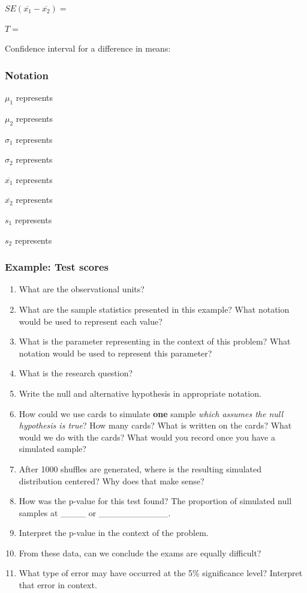 \documentclass[
]{report}
\newcommand{\rgs}{\vspace{12pt}} %
\begin{document}
\(SE(\overline{x_1} - \overline{x_2})=\)
\rgs

\(T=\)
\rgs

Confidence interval for a difference in means:
\rgs

\hypertarget{notation-4}{%
\subsubsection*{Notation}\label{notation-4}}

\(\mu_1\) represents
\rgs

\(\mu_2\) represents
\rgs

\(\sigma_1\) represents
\rgs

\(\sigma_2\) represents
\rgs

\(\overline{x_1}\) represents
\rgs

\(\overline{x_2}\) represents
\rgs

\(s_1\) represents
\rgs

\(s_2\) represents
\rgs

\hypertarget{example-test-scores}{%
\subsubsection*{Example: Test scores}\label{example-test-scores}}

\begin{enumerate}
\def\labelenumi{\arabic{enumi}.}
\item
  What are the observational units?
  \rgs
\item
  What are the sample statistics presented in this example? What notation would be used to represent each value?
  \rgs
\item
  What is the parameter representing in the context of this problem? What notation would be used to represent this parameter?
  \rgs
  \rgs
\item
  What is the research question?
  \rgs
\item
  Write the null and alternative hypothesis in appropriate notation.
  \rgs
\item
  How could we use cards to simulate \textbf{one} sample \emph{which assumes the null hypothesis is true}? How many cards? What is written on the cards? What would we do with the cards? What would you record once you have a simulated sample?
  \rgs
  \rgs
  \rgs
\item
  After 1000 shuffles are generated, where is the resulting simulated distribution centered? Why does that make sense?
  \rgs
  \rgs
\item
  How was the p-value for this test found? The proportion of simulated null samples at \_\_\_\_ or \_\_\_\_\_\_\_\_\_\_\_.
  \rgs
\item
  Interpret the p-value in the context of the problem.
  \rgs
  \rgs
\item
  From these data, can we conclude the exams are equally difficult?
  \rgs
\item
  What type of error may have occurred at the 5\% significance level? Interpret that error in context.
  \rgs
  \rgs
\end{enumerate}
\end{document}
